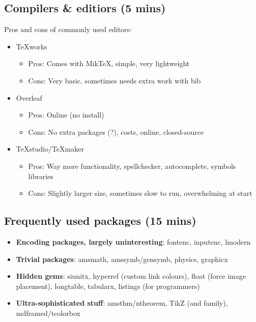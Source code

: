 \documentclass[a4paper]{article}
\begin{document}
\subsection{Compilers \& editiors (5 mins)}\label{compilers}

Pros and cons of commonly used editors:

\begin{itemize}
	
	\item TeXworks 
	\begin{itemize}
		\item Pros: Comes with MikTeX, simple, very lightweight
		\item Cons: Very basic, sometimes needs extra work with bib
	\end{itemize}
	
	\item Overleaf
	\begin{itemize}
		\item Pros: Online (no install)
		\item Cons: No extra packages (?), costs, online, closed-source
	\end{itemize}
	
	\item TeXstudio/TeXmaker
	\begin{itemize}
		\item Pros: Way more functionality, spellchecker, autocomplete, symbols libraries\footnotemark{}
		\item Cons: Slightly larger size, sometimes slow to run, overwhelming at start
	\end{itemize}
\end{itemize}

\subsection{Frequently used packages (15 mins)}

\begin{itemize}
	\item \textbf{Encoding packages, largely uninteresting}: fontenc, inputenc, lmodern
	\item \textbf{Trivial packages}: amsmath, amssymb/gensymb, physics, graphicx
	\item \textbf{Hidden gems}: siunitx, hyperref (custom link colours), float (force image placement), longtable, tabularx, listings (for programmers)
	\item \textbf{Ultra-sophisticated stuff}: amsthm/ntheorem, TikZ (and family), mdframed/tcolorbox
\end{itemize}
\end{document}
